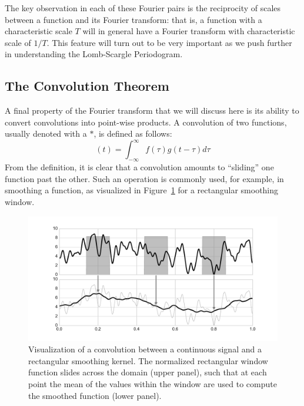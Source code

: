 \documentclass[preprint]{aastex}
\newcommand{\Fig}[1]{Figure~\ref{fig:#1}}
\newcommand{\figlabel}[1]{\label{fig:#1}}
\newcommand{\eqlabel}[1]{\label{eq:#1}}
\begin{document}
The key observation in each of these Fourier pairs is the reciprocity
of scales between a function and its Fourier transform:
that is, a function with a characteristic scale $T$ will in general
have a Fourier transform with characteristic scale of $1/T$.
This feature will turn out to be very important as we push further in
understanding the Lomb-Scargle Periodogram.


\subsection{The Convolution Theorem}

A final property of the Fourier transform that we will discuss here is its
ability to convert convolutions into point-wise products.
A convolution of two functions, usually denoted with a $\ast$, is defined
as follows:
\begin{equation}
  [f \ast g](t) = \int_{-\infty}^\infty f(\tau)g(t - \tau) d\tau
  \eqlabel{convolution-definition}
\end{equation}
From the definition, it is clear that a convolution amounts to ``sliding'' one
function past the other.
Such an operation is commonly used, for example, in smoothing a function,
as visualized in \Fig{convolution} for a rectangular smoothing window.

\begin{figure}[ht]
  \centering
  \includegraphics[width=\textwidth]{fig04_Convolution_Diagram}
  \caption{Visualization of a convolution between a continuous signal and a rectangular smoothing kernel.
    The normalized rectangular window function slides across the domain (upper panel),
    such that at each point the mean of the values within the window are
    used to compute the smoothed function (lower panel).
    \figlabel{convolution}}
\end{figure}
\end{document}
